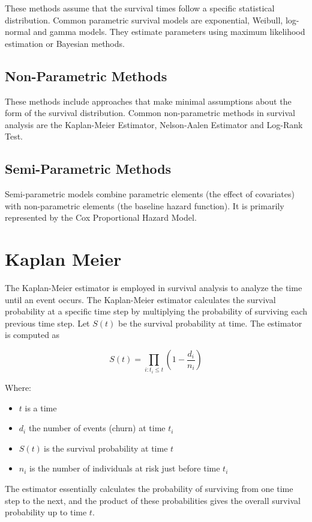 \documentclass[doublespacing]{report} %
\begin{document}
These methods assume that the survival times follow a specific statistical distribution. Common parametric survival models are exponential, Weibull, log-normal and gamma models. They estimate parameters using maximum likelihood estimation or Bayesian methods.

\subsection{Non-Parametric Methods}

These methods include approaches that make minimal assumptions about the form of the survival distribution. Common non-parametric methods in survival analysis are the Kaplan-Meier Estimator, Nelson-Aalen Estimator and Log-Rank Test.

\subsection{Semi-Parametric Methods}

Semi-parametric models combine parametric elements (the effect of covariates) with non-parametric elements (the baseline hazard function). It is primarily represented by the Cox Proportional Hazard Model.

\section{Kaplan Meier}
The Kaplan-Meier estimator is employed in survival analysis to analyze the time until an event occurs. The Kaplan-Meier estimator calculates the survival probability at a specific time step by multiplying the probability of surviving each previous time step.
Let \( S(t) \) be the survival probability at time. The estimator is computed as

\[S\left(t\right)=\prod_{i:t_i\le t}\left(1-\frac{d_i}{n_i}\right)\]

Where:
 \begin{itemize}
     \item \(t\) is a time
     \item \(d_i \) the number of events (churn) at time \(t_i\)
     \item \(S\left(t\right)\ \)is the survival probability at time \(t\)
     \item \(n_i\) is the number of individuals at risk just before time \(t_i\)
 \end{itemize}
The estimator essentially calculates the probability of surviving from one time step to the next, and the product of these probabilities gives the overall survival probability up to time \(t\).
\end{document}
